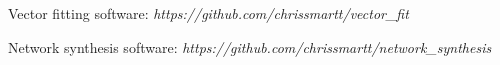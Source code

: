 \begin{thebibliography}{9}

Vector fitting software: 
\textsl{https://github.com/chrissmartt/vector\_fit}


Network synthesis software: 
\textsl{https://github.com/chrissmartt/network\_synthesis}

\end{thebibliography}


